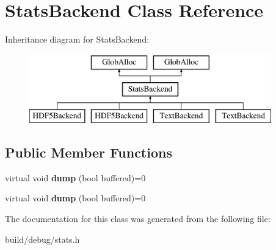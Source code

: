 \hypertarget{classStatsBackend}{\section{Stats\-Backend Class Reference}
\label{classStatsBackend}
}
Inheritance diagram for Stats\-Backend\-:\begin{figure}[H]
\begin{center}
\leavevmode
\includegraphics[height=3.000000cm]{classStatsBackend}
\end{center}
\end{figure}
\subsection*{Public Member Functions}
\begin{DoxyCompactItemize}
\item 
\hypertarget{classStatsBackend_ad4c882d3d8c18f5d013373348c2b40af}{virtual void {\bfseries dump} (bool buffered)=0}\label{classStatsBackend_ad4c882d3d8c18f5d013373348c2b40af}

\item 
\hypertarget{classStatsBackend_ad4c882d3d8c18f5d013373348c2b40af}{virtual void {\bfseries dump} (bool buffered)=0}\label{classStatsBackend_ad4c882d3d8c18f5d013373348c2b40af}

\end{DoxyCompactItemize}


The documentation for this class was generated from the following file\-:\begin{DoxyCompactItemize}
\item 
build/debug/stats.\-h\end{DoxyCompactItemize}
